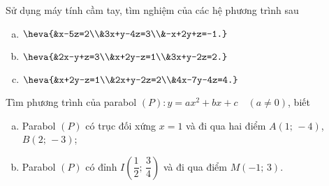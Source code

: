 \begin{bt}
	Sử dụng máy tính cầm tay, tìm nghiệm của các hệ phương trình sau
	\begin{enumerate}[a)]
		\item $\heva{&x-5z=2\\&3x+y-4z=3\\&-x+2y+z=-1.}$
		\item $\heva{&2x-y+z=3\\&x+2y-z=1\\&3x+y-2z=2.}$
		\item $\heva{&x+2y-z=1\\&2x+y-2z=2\\&4x-7y-4z=4.}$
	\end{enumerate}
\end{bt}

\begin{bt}
	Tìm phương trình của parabol $(P)\colon y=ax^{2}+bx+c \quad (a\neq 0)$, biết
	\begin{enumerate}[a)]
		\item Parabol $(P)$ có trục đối xứng $x=1$ và đi qua hai điểm $A(1;\,-4)$, $B(2;\,-3)$;
		\item Parabol $(P)$ có đỉnh $I\left(\dfrac{1}{2};\,\dfrac{3}{4}\right)$ và đi qua điểm $M(-1;\,3)$.
	\end{enumerate}
\end{bt}

